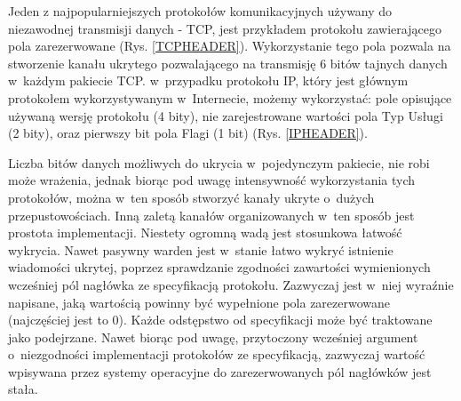\documentclass[a4paper, twoside, 12pt]{report}
\begin{document}
        Jeden z najpopularniejszych protokołów komunikacyjnych używany do niezawodnej
        transmisji danych - TCP, jest przykładem protokołu zawierającego pola zarezerwowane (Rys. \ref{TCPHEADER}).
        Wykorzystanie tego pola pozwala na stworzenie kanału ukrytego pozwalającego
        na transmisję 6 bitów tajnych danych w~każdym pakiecie TCP. w~przypadku protokołu
        IP, który jest głównym protokołem wykorzystywanym w~Internecie, możemy wykorzystać: pole
        opisujące używaną wersję protokołu (4 bity), nie zarejestrowane wartości pola Typ Usługi (2 bity),
        oraz pierwszy bit pola Flagi (1 bit) (Rys. \ref{IPHEADER})\cite{IPRFC}.

        Liczba bitów danych
        możliwych do ukrycia w~pojedynczym pakiecie, nie robi może wrażenia, jednak biorąc
        pod uwagę intensywność wykorzystania tych protokołów, można w~ten sposób
        stworzyć kanały ukryte o~dużych przepustowościach. Inną zaletą kanałów organizowanych
        w~ten sposób jest prostota implementacji. Niestety ogromną wadą jest stosunkowa
        łatwość wykrycia. Nawet pasywny warden jest w~stanie łatwo wykryć istnienie wiadomości
        ukrytej, poprzez sprawdzanie zgodności zawartości wymienionych wcześniej pól
        nagłówka ze specyfikacją protokołu. Zazwyczaj jest w~niej wyraźnie napisane,
        jaką wartością powinny być wypełnione pola zarezerwowane (najczęściej jest to 0).
        Każde odstępstwo od specyfikacji może być traktowane jako podejrzane. Nawet biorąc
        pod uwagę, przytoczony wcześniej argument o~niezgodności implementacji protokołów
        ze specyfikacją, zazwyczaj wartość wpisywana przez systemy operacyjne do
        zarezerwowanych pól nagłówków jest stała.
\end{document}
